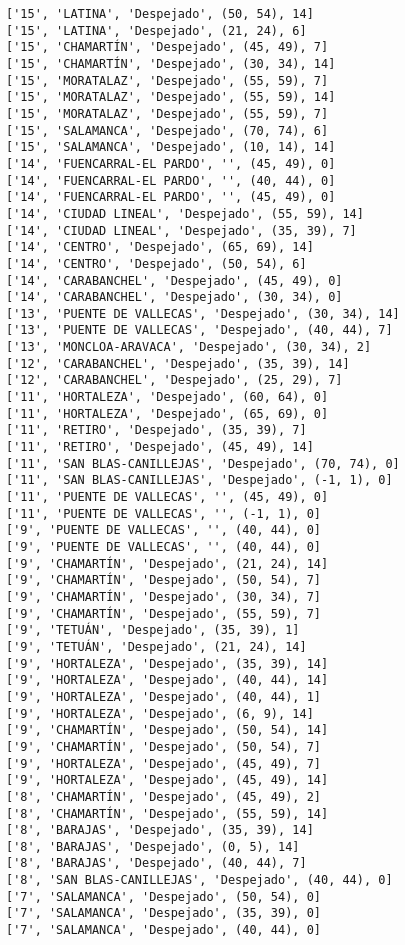 \documentclass[11pt]{article}
\begin{document}
\begin{Verbatim}[commandchars=\\\{\}]
['15', 'LATINA', 'Despejado', (50, 54), 14]
['15', 'LATINA', 'Despejado', (21, 24), 6]
['15', 'CHAMARTÍN', 'Despejado', (45, 49), 7]
['15', 'CHAMARTÍN', 'Despejado', (30, 34), 14]
['15', 'MORATALAZ', 'Despejado', (55, 59), 7]
['15', 'MORATALAZ', 'Despejado', (55, 59), 14]
['15', 'MORATALAZ', 'Despejado', (55, 59), 7]
['15', 'SALAMANCA', 'Despejado', (70, 74), 6]
['15', 'SALAMANCA', 'Despejado', (10, 14), 14]
['14', 'FUENCARRAL-EL PARDO', '', (45, 49), 0]
['14', 'FUENCARRAL-EL PARDO', '', (40, 44), 0]
['14', 'FUENCARRAL-EL PARDO', '', (45, 49), 0]
['14', 'CIUDAD LINEAL', 'Despejado', (55, 59), 14]
['14', 'CIUDAD LINEAL', 'Despejado', (35, 39), 7]
['14', 'CENTRO', 'Despejado', (65, 69), 14]
['14', 'CENTRO', 'Despejado', (50, 54), 6]
['14', 'CARABANCHEL', 'Despejado', (45, 49), 0]
['14', 'CARABANCHEL', 'Despejado', (30, 34), 0]
['13', 'PUENTE DE VALLECAS', 'Despejado', (30, 34), 14]
['13', 'PUENTE DE VALLECAS', 'Despejado', (40, 44), 7]
['13', 'MONCLOA-ARAVACA', 'Despejado', (30, 34), 2]
['12', 'CARABANCHEL', 'Despejado', (35, 39), 14]
['12', 'CARABANCHEL', 'Despejado', (25, 29), 7]
['11', 'HORTALEZA', 'Despejado', (60, 64), 0]
['11', 'HORTALEZA', 'Despejado', (65, 69), 0]
['11', 'RETIRO', 'Despejado', (35, 39), 7]
['11', 'RETIRO', 'Despejado', (45, 49), 14]
['11', 'SAN BLAS-CANILLEJAS', 'Despejado', (70, 74), 0]
['11', 'SAN BLAS-CANILLEJAS', 'Despejado', (-1, 1), 0]
['11', 'PUENTE DE VALLECAS', '', (45, 49), 0]
['11', 'PUENTE DE VALLECAS', '', (-1, 1), 0]
['9', 'PUENTE DE VALLECAS', '', (40, 44), 0]
['9', 'PUENTE DE VALLECAS', '', (40, 44), 0]
['9', 'CHAMARTÍN', 'Despejado', (21, 24), 14]
['9', 'CHAMARTÍN', 'Despejado', (50, 54), 7]
['9', 'CHAMARTÍN', 'Despejado', (30, 34), 7]
['9', 'CHAMARTÍN', 'Despejado', (55, 59), 7]
['9', 'TETUÁN', 'Despejado', (35, 39), 1]
['9', 'TETUÁN', 'Despejado', (21, 24), 14]
['9', 'HORTALEZA', 'Despejado', (35, 39), 14]
['9', 'HORTALEZA', 'Despejado', (40, 44), 14]
['9', 'HORTALEZA', 'Despejado', (40, 44), 1]
['9', 'HORTALEZA', 'Despejado', (6, 9), 14]
['9', 'CHAMARTÍN', 'Despejado', (50, 54), 14]
['9', 'CHAMARTÍN', 'Despejado', (50, 54), 7]
['9', 'HORTALEZA', 'Despejado', (45, 49), 7]
['9', 'HORTALEZA', 'Despejado', (45, 49), 14]
['8', 'CHAMARTÍN', 'Despejado', (45, 49), 2]
['8', 'CHAMARTÍN', 'Despejado', (55, 59), 14]
['8', 'BARAJAS', 'Despejado', (35, 39), 14]
['8', 'BARAJAS', 'Despejado', (0, 5), 14]
['8', 'BARAJAS', 'Despejado', (40, 44), 7]
['8', 'SAN BLAS-CANILLEJAS', 'Despejado', (40, 44), 0]
['7', 'SALAMANCA', 'Despejado', (50, 54), 0]
['7', 'SALAMANCA', 'Despejado', (35, 39), 0]
['7', 'SALAMANCA', 'Despejado', (40, 44), 0]

\end{Verbatim}
\end{document}
